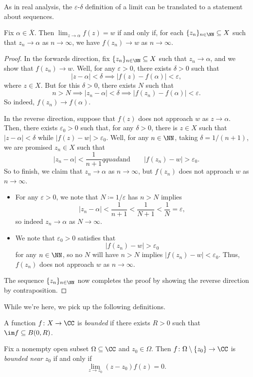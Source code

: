 \documentclass[../notes.tex]{subfiles}
\begin{document}
As in real analysis, the $\varepsilon$-$\delta$ definition of a limit can be translated to a statement about sequences.
\begin{proposition} \label{prop:altlimit}
	Fix $\alpha\in\overline X$. Then $\lim_{z\to\alpha}f(z)=w$ if and only if, for each $\{z_n\}_{n\in\NN}\subseteq X$ such that $z_n\to\alpha$ as $n\to\infty$, we have $f(z_n)\to w$ as $n\to\infty$.
\end{proposition}
\begin{proof}
	In the forwards direction, fix $\{z_n\}_{n\in\NN}\subseteq X$ such that $z_n\to\alpha$, and we show that $f(z_n)\to w$. Well, for any $\varepsilon>0$, there exists $\delta>0$ such that
	\[|z-\alpha|<\delta\implies|f(z)-f(\alpha)|<\varepsilon,\]
	where $z\in X$. But for this $\delta>0$, there exists $N$ such that
	\[n>N\implies|z_n-\alpha|<\delta\implies|f(z_n)-f(\alpha)|<\varepsilon.\]
	So indeed, $f(z_n)\to f(\alpha)$.

	In the reverse direction, suppose that $f(z)$ does not approach $w$ as $z\to\alpha$. Then, there exists $\varepsilon_0>0$ such that, for any $\delta>0$, there is $z\in X$ such that $|z-\alpha|<\delta$ while $|f(z)-w|>\varepsilon_0$. Well, for any $n\in\NN$, taking $\delta=1/(n+1)$, we are promised $z_n\in X$ such that
	\[|z_n-\alpha|<\frac1{n+1}qquad\text{and}\qquad|f(z_n)-w|>\varepsilon_0.\]
	So to finish, we claim that $z_n\to\alpha$ as $n\to\infty$, but $f(z_n)$ does not approach $w$ as $n\to\infty$.
	\begin{itemize}
		\item For any $\varepsilon>0$, we note that $N\coloneqq 1/\varepsilon$ has $n>N$ implies
		\[|z_n-\alpha|<\frac1{n+1}<\frac1{N+1}<\frac1N=\varepsilon,\]
		so indeed $z_n\to\alpha$ as $N\to\infty$.
		\item We note that $\varepsilon_0>0$ satisfies that
		\[|f(z_n)-w|>\varepsilon_0\]
		for any $n\in\NN$, so no $N$ will have $n>N$ implies $|f(z_n)-w|<\varepsilon_0$. Thus, $f(z_n)$ does not approach $w$ as $n\to\infty$.
	\end{itemize}
	The sequence $\{z_n\}_{n\in\NN}$ now completes the proof by showing the reverse direction by contraposition.
\end{proof}

While we're here, we pick up the following definitions.
\begin{definition}[Bounded]
	A function $f\colon X\to\CC$ is \textit{bounded} if there exists $R>0$ such that $\im f\subseteq B(0,R)$.
\end{definition}
\begin{definition}
	Fix a nonempty open subset $\Omega\subseteq\CC$ and $z_0\in\Omega$. Then $f\colon\Omega\setminus\{z_0\}\to\CC$ is \textit{bounded near} $z_0$ if and only if
	\[\lim_{z\to z_0}(z-z_0)f(z)=0.\]
\end{definition}
\end{document}
